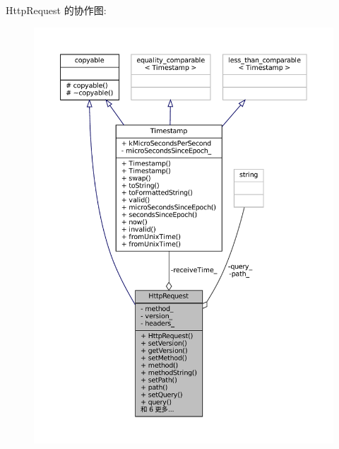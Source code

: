 Http\+Request 的协作图\+:
\nopagebreak
\begin{figure}[H]
\begin{center}
\leavevmode
\includegraphics[width=350pt]{classmuduo_1_1net_1_1HttpRequest__coll__graph}
\end{center}
\end{figure}
